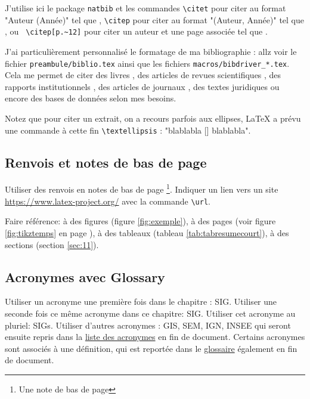 J'utilise ici le package \verb!natbib! et les commandes \verb!\citet! pour citer au format "Auteur (Année)" tel que \citet{Anselin1990}, \verb!\citep! pour citer au format "(Auteur, Année)" tel que \citep{Holloway2007}, ou \verb! \citep[p.~12]!  pour citer un auteur et une page associée tel que \citep[p.~12]{Margeon2009}. 

J'ai particulièrement personnalisé le formatage de ma bibliographie : allz voir le fichier  \verb!preambule/biblio.tex! ainsi que les fichiers \verb!macros/bibdriver_*.tex!. 
Cela me permet de citer des livres \citep{Margeon2009,Boulay2013}, des articles de revues scientifiques  \citep{Anselin1990,Holloway2007}, des rapports institutionnels \citep{Pomel2006,Roumegoux2008}, des articles de journaux \citep{AQUI20170405,LAVIGNE20130531}, des textes juridiques  ou encore des bases de données \citep{DBGEOFLA,DBINSEERGP} selon mes besoins.

Notez que pour citer un extrait, on a recours parfois aux ellipses, \LaTeX{} a prévu une commande à cette fin \verb!\textellipsis! : "blablabla [\textellipsis] blablabla".

\subsection{Renvois et notes de bas de page}

Utiliser des renvois en notes de bas de page \footnote{Une note de bas de page}. Indiquer un lien vers un site \url{https://www.latex-project.org/} avec la commande \verb!\url!.

Faire référence: à des figures (figure \ref{fig:exemple}), à des pages  (voir figure \ref{fig:tikztemps} en page \pageref{fig:tikztemps}), à des tableaux (tableau \ref{tab:tabresumecourt}), à des sections (section \ref{sec:11}). 

\subsection{Acronymes avec Glossary}

Utiliser un acronyme une première fois dans le chapitre : \gls{SIG}. Utiliser une seconde fois ce même acronyme dans ce chapitre: \gls{SIG}. Utiliser cet acronyme au pluriel: \glspl{SIG}. Utiliser d'autres acronymes : \gls{GIS}, \gls{SEM}, \gls{IGN}, \gls{INSEE} qui seront ensuite repris dans la \hyperref[list:acro]{liste des acronymes} en fin de document. Certains acronymes sont associés à une définition, qui est reportée dans le \hyperref[list:gloss]{glossaire} également en fin de document.  

